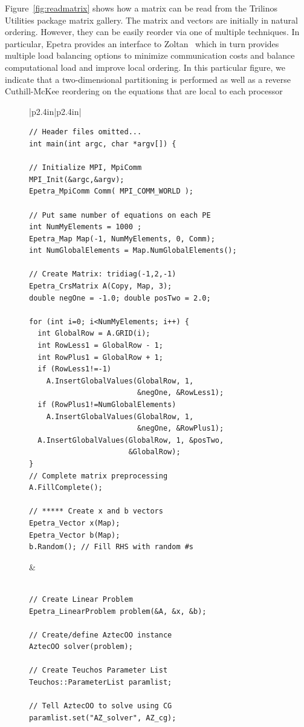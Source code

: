 \documentclass[acmtoms,acmnow]{acmtrans2m}
\begin{document}
Figure~\ref{fig:readmatrix} shows how a matrix can be read from the
Trilinos Utilities package matrix gallery.  The matrix and vectors are
initially in natural ordering.  However, they can be easily reorder
via one of multiple techniques.  In particular, Epetra provides an
interface to Zoltan~\cite{zoltan} which in turn provides multiple load
balancing options to minimize communication costs and balance
computational load and improve local ordering.  In this particular figure, we indicate that a
two-dimensional partitioning is performed as well as a reverse
Cuthill-McKee reordering on the equations that are local to each processor
\begin{figure}
{\scriptsize
\begin{tabular}{|p{2.4in}|p{2.4in}|}\hline
\begin{verbatim}
// Header files omitted...
int main(int argc, char *argv[]) {

// Initialize MPI, MpiComm
MPI_Init(&argc,&argv);
Epetra_MpiComm Comm( MPI_COMM_WORLD );
                     
// Put same number of equations on each PE   
int NumMyElements = 1000 ;
Epetra_Map Map(-1, NumMyElements, 0, Comm);
int NumGlobalElements = Map.NumGlobalElements();

// Create Matrix: tridiag(-1,2,-1) 
Epetra_CrsMatrix A(Copy, Map, 3);
double negOne = -1.0; double posTwo = 2.0;

for (int i=0; i<NumMyElements; i++) {
  int GlobalRow = A.GRID(i); 
  int RowLess1 = GlobalRow - 1; 
  int RowPlus1 = GlobalRow + 1;
  if (RowLess1!=-1) 
    A.InsertGlobalValues(GlobalRow, 1, 
                         &negOne, &RowLess1);
  if (RowPlus1!=NumGlobalElements) 
    A.InsertGlobalValues(GlobalRow, 1, 
                         &negOne, &RowPlus1);
  A.InsertGlobalValues(GlobalRow, 1, &posTwo, 
                       &GlobalRow);
}
// Complete matrix preprocessing
A.FillComplete(); 

// ***** Create x and b vectors 
Epetra_Vector x(Map);
Epetra_Vector b(Map);
b.Random(); // Fill RHS with random #s
\end{verbatim}
&
\begin{verbatim}

// Create Linear Problem 
Epetra_LinearProblem problem(&A, &x, &b);  

// Create/define AztecOO instance 
AztecOO solver(problem);

// Create Teuchos Parameter List
Teuchos::ParameterList paramlist;

// Tell AztecOO to solve using CG
paramlist.set("AZ_solver", AZ_cg);
 

\end{verbatim}
\end{tabular}}
\end{figure}
\end{document}
